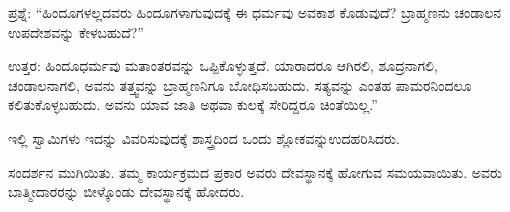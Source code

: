 ಪ್ರಶ್ನೆ: “ಹಿಂದೂಗಳಲ್ಲದವರು ಹಿಂದೂಗಳಾಗುವುದಕ್ಕೆ ಈ ಧರ್ಮವು ಅವಕಾಶ ಕೊಡುವುದೆ? ಬ್ರಾಹ್ಮಣನು ಚಂಡಾಲನ ಉಪದೇಶವನ್ನು ಕೇಳಬಹುದೆ?”

\vskip 4pt

ಉತ್ತರ: ಹಿಂದೂಧರ್ಮವು ಮತಾಂತರವನ್ನು ಒಪ್ಪಿಕೊಳ್ಳುತ್ತದೆ. ಯಾರಾದರೂ ಆಗಿರಲಿ, ಶೂದ್ರನಾಗಲಿ, ಚಂಡಾಲನಾಗಲಿ, ಅವನು ತತ್ತ್ವವನ್ನು ಬ್ರಾಹ್ಮಣನಿಗೂ ಬೋಧಿಸಬಹುದು. ಸತ್ಯವನ್ನು ಎಂತಹ ಪಾಮರನಿಂದಲೂ ಕಲಿತುಕೊಳ್ಳಬಹುದು. ಅವನು ಯಾವ ಜಾತಿ ಅಥವಾ ಕುಲಕ್ಕೆ ಸೇರಿದ್ದರೂ ಚಿಂತೆಯಿಲ್ಲ.”

\vskip 4pt

ಇಲ್ಲಿ ಸ್ವಾಮಿಗಳು ಇದನ್ನು ವಿವರಿಸುವುದಕ್ಕೆ ಶಾಸ್ತ್ರದಿಂದ ಒಂದು ಶ್ಲೋಕವನ್ನು\break ಉದಹರಿಸಿದರು.

\vskip 4pt

ಸಂದರ್ಶನ ಮುಗಿಯಿತು. ತಮ್ಮ ಕಾರ್ಯಕ್ರಮದ ಪ್ರಕಾರ ಅವರು ದೇವಸ್ಥಾನಕ್ಕೆ ಹೋಗುವ ಸಮಯವಾಯಿತು. ಅವರು ಬಾತ್ಮೀದಾರರನ್ನು ಬೀಳ್ಕೊಂಡು ದೇವಸ್ಥಾನಕ್ಕೆ ಹೋದರು.


